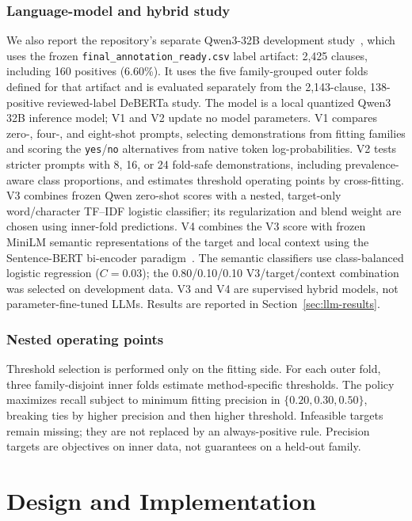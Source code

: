 \documentclass[12pt,a4paper,oneside]{report}
\begin{document}
\subsection{Language-model and hybrid study}

We also report the repository's separate Qwen3-32B development study~\cite{yang2025qwen3}, which uses the frozen \texttt{final\_annotation\_ready.csv} label artifact: 2,425 clauses, including 160 positives (6.60\%). It uses the five family-grouped outer folds defined for that artifact and is evaluated separately from the 2,143-clause, 138-positive reviewed-label DeBERTa study. The model is a local quantized Qwen3 32B inference model; V1 and V2 update no model parameters. V1 compares zero-, four-, and eight-shot prompts, selecting demonstrations from fitting families and scoring the \texttt{yes}/\texttt{no} alternatives from native token log-probabilities. V2 tests stricter prompts with 8, 16, or 24 fold-safe demonstrations, including prevalence-aware class proportions, and estimates threshold operating points by cross-fitting. V3 combines frozen Qwen zero-shot scores with a nested, target-only word/character TF--IDF logistic classifier; its regularization and blend weight are chosen using inner-fold predictions. V4 combines the V3 score with frozen MiniLM semantic representations of the target and local context using the Sentence-BERT bi-encoder paradigm~\cite{reimers2019sbert}. The semantic classifiers use class-balanced logistic regression ($C=0.03$); the 0.80/0.10/0.10 V3/target/context combination was selected on development data. V3 and V4 are supervised hybrid models, not parameter-fine-tuned LLMs. Results are reported in Section~\ref{sec:llm-results}.

\subsection{Nested operating points}

Threshold selection is performed only on the fitting side. For each outer fold, three family-disjoint inner folds estimate method-specific thresholds. The policy maximizes recall subject to minimum fitting precision in $\{0.20,0.30,0.50\}$, breaking ties by higher precision and then higher threshold. Infeasible targets remain missing; they are not replaced by an always-positive rule. Precision targets are objectives on inner data, not guarantees on a held-out family.

\chapter{Design and Implementation}
\end{document}
